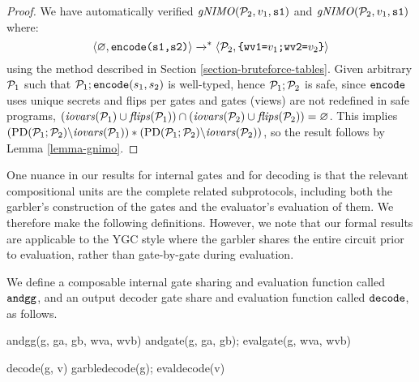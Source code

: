 \begin{proof}
  We have automatically verified
  $\mathit{gNIMO}(\mathcal{P}_2,v_1,\texttt{s1})$ and $\mathit{gNIMO}(\mathcal{P}_2,v_1,\texttt{s1})$
  where:
  $$
  \langle \varnothing,\texttt{encode(s1,s2)} \rangle \xrightarrow{}^{*}
  \langle \mathcal{P}_2,\texttt{\{wv1=}v_1\texttt{;wv2=}v_2\texttt{\}} \rangle
  $$
  using the method described in Section \ref{section-bruteforce-tables}.
  Given arbitrary $\mathcal{P}_1$ such that $\mathcal{P}_1;\texttt{encode}(s_1,s_2)$
  is well-typed, hence $\mathcal{P}_1;\mathcal{P}_2$ is safe, 
  since $\texttt{encode}$ uses unique secrets and flips per gates and
  gates (views) are not redefined in safe programs,
  $(\mathit{iovars}(\mathcal{P}_1) \cup \mathit{flips}(\mathcal{P}_1)) \cap (\mathit{iovars}(\mathcal{P}_2) \cup
  \mathit{flips}(\mathcal{P}_2)) = \varnothing$. This implies 
  $(\mathrm{PD}(\mathcal{P}_1;\mathcal{P}_2)\backslash\mathit{iovars}(\mathcal{P}_1)) *
  (\mathrm{PD}(\mathcal{P}_1;\mathcal{P}_2)\backslash\mathit{iovars}(\mathcal{P}_2))$, so the result follows
  by Lemma \ref{lemma-gnimo}.
\end{proof}

One nuance in our results for internal gates and for decoding is that the relevant
compositional units are the complete related subprotocols, including both
the garbler's construction of the gates and the evaluator's evaluation of
them. We therefore make the following definitions. However, we note that
our formal results are applicable to the YGC style where the garbler shares
the entire circuit prior to evaluation, rather than gate-by-gate during
evaluation. 
\begin{definition}
  \label{ygc-modules}
  We define a composable internal  gate sharing and evaluation function
  called $\texttt{andgg}$, and an output decoder gate share and evaluation function called
  $\texttt{decode}$, as follows. 
\begin{verbatimtab}
  andgg(g, ga, gb, wva, wvb) { andgate(g, ga, gb); evalgate(g, wva, wvb) }
 
  decode(g, v) { garbledecode(g); evaldecode(v) }
\end{verbatimtab}
\end{definition}


